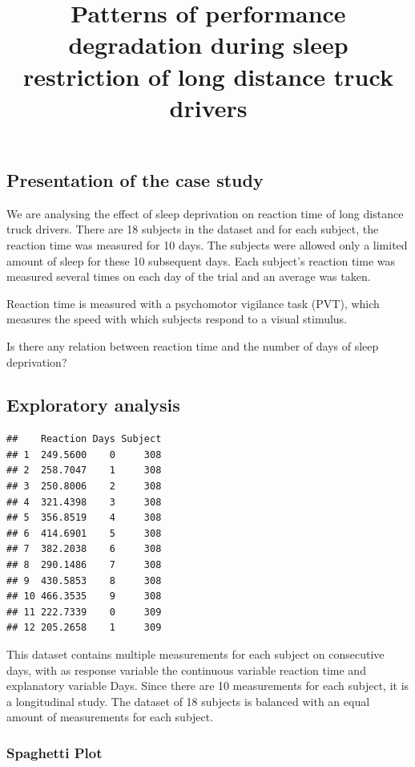 \documentclass[
]{article}
\title{Patterns of performance degradation during sleep restriction of long
distance truck drivers}
\author{}
\date{\vspace{-2.5em}}
\begin{document}
\maketitle

\hypertarget{presentation-of-the-case-study}{%
\subsection{Presentation of the case
study}\label{presentation-of-the-case-study}}

We are analysing the effect of sleep deprivation on reaction time of
long distance truck drivers. There are 18 subjects in the dataset and
for each subject, the reaction time was measured for 10 days. The
subjects were allowed only a limited amount of sleep for these 10
subsequent days. Each subject's reaction time was measured several times
on each day of the trial and an average was taken.

Reaction time is measured with a psychomotor vigilance task (PVT), which
measures the speed with which subjects respond to a visual stimulus.

Is there any relation between reaction time and the number of days of
sleep deprivation?

\hypertarget{exploratory-analysis}{%
\subsection{Exploratory analysis}\label{exploratory-analysis}}

\begin{verbatim}
##    Reaction Days Subject
## 1  249.5600    0     308
## 2  258.7047    1     308
## 3  250.8006    2     308
## 4  321.4398    3     308
## 5  356.8519    4     308
## 6  414.6901    5     308
## 7  382.2038    6     308
## 8  290.1486    7     308
## 9  430.5853    8     308
## 10 466.3535    9     308
## 11 222.7339    0     309
## 12 205.2658    1     309
\end{verbatim}

This dataset contains multiple measurements for each subject on
consecutive days, with as response variable the continuous variable
reaction time and explanatory variable Days. Since there are 10
measurements for each subject, it is a longitudinal study. The dataset
of 18 subjects is balanced with an equal amount of measurements for each
subject.

\hypertarget{spaghetti-plot}{%
\subsubsection{Spaghetti Plot}\label{spaghetti-plot}}
\end{document}
